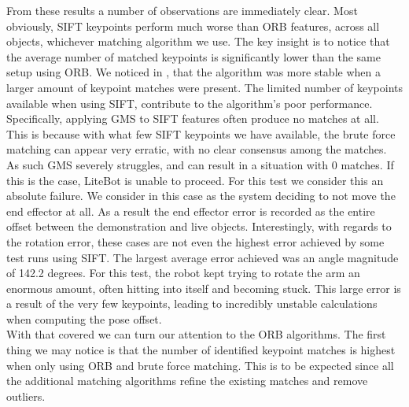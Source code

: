 From these results a number of observations are immediately clear. Most obviously, SIFT keypoints perform much worse than ORB features, across all objects, whichever matching algorithm we use. The key insight is to notice that the average number of matched keypoints is significantly lower than the same setup using ORB. We noticed in , that the algorithm was more stable when a larger amount of keypoint matches were present. The limited number of keypoints available when using SIFT, contribute to the algorithm's poor performance. Specifically, applying GMS to SIFT features often produce no matches at all. This is because with what few SIFT keypoints we have available, the brute force matching can appear very erratic, with no clear consensus among the matches. As such GMS severely struggles, and can result in a situation with 0 matches. If this is the case, LiteBot is unable to proceed. For this test we consider this an absolute failure. We consider in this case as the system deciding to not move the end effector at all. As a result the end effector error is recorded as the entire offset between the demonstration and live objects. Interestingly, with regards to the rotation error, these cases are not even the highest error achieved by some test runs using SIFT. The largest average error achieved was an angle magnitude of 142.2 degrees. For this test, the robot kept trying to rotate the arm an enormous amount, often hitting into itself and becoming stuck. This large error is a result of the very few keypoints, leading to incredibly unstable calculations when computing the pose offset.\\

With that covered we can turn our attention to the ORB algorithms. The first thing we may notice is that the number of identified keypoint matches is highest when only using ORB and brute force matching. This is to be expected since all the additional matching algorithms refine the existing matches and remove outliers. 


